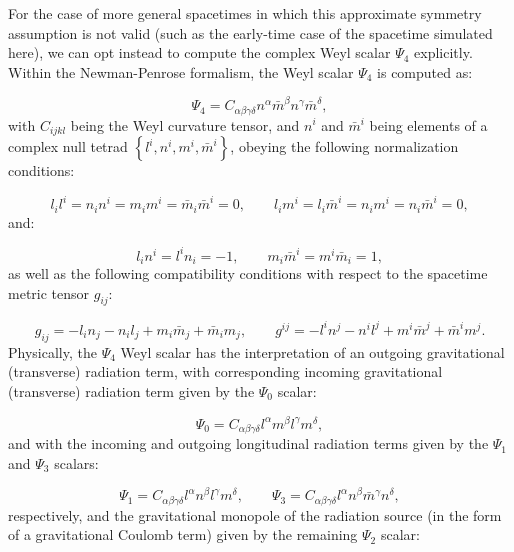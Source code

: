 \documentclass{article}
\begin{document}
For the case of more general spacetimes in which this approximate symmetry assumption is not valid (such as the early-time case of the spacetime simulated here), we can opt instead to compute the complex Weyl scalar ${\Psi_4}$ explicitly. Within the Newman-Penrose formalism\cite{newman}, the Weyl scalar ${\Psi_4}$ is computed as:

\begin{equation}
\Psi_4 = C_{\alpha \beta \gamma \delta} n^{\alpha} \bar{m}^{\beta} n^{\gamma} \bar{m}^{\delta},
\end{equation}
with ${C_{i j k l}}$ being the Weyl curvature tensor, and ${n^i}$ and ${\bar{m}^i}$ being elements of a complex null tetrad ${\left\lbrace l^i, n^i, m^i, \bar{m}^i \right\rbrace}$, obeying the following normalization conditions:

\begin{equation}
l_i l^i = n_i n^i = m_i m^i = \bar{m}_i \bar{m}^i = 0, \qquad l_i m^i = l_i \bar{m}^i = n_i m^i = n_i \bar{m}^i = 0,
\end{equation}
and:

\begin{equation}
l_i n^i = l^i n_i = -1, \qquad m_i \bar{m}^i = m^i \bar{m}_i = 1,
\end{equation}
as well as the following compatibility conditions with respect to the spacetime metric tensor ${g_{i j}}$:

\begin{equation}
g_{i j} = -l_i n_j - n_i l_j + m_i \bar{m}_j + \bar{m}_i m_j, \qquad g^{i j} = -l^i n^j - n^i l^j + m^i \bar{m}^j + \bar{m}^i m^j.
\end{equation}
Physically, the ${\Psi_4}$ Weyl scalar has the interpretation of an outgoing gravitational (transverse) radiation term\cite{szekeres2}, with corresponding incoming gravitational (transverse) radiation term given by the ${\Psi_0}$ scalar:

\begin{equation}
\Psi_0 = C_{\alpha \beta \gamma \delta} l^{\alpha} m^{\beta} l^{\gamma} m^{\delta},
\end{equation}
and with the incoming and outgoing longitudinal radiation terms given by the ${\Psi_1}$ and ${\Psi_3}$ scalars:

\begin{equation}
\Psi_1 = C_{\alpha \beta \gamma \delta} l^{\alpha} n^{\beta} l^{\gamma} m^{\delta}, \qquad \Psi_3 = C_{\alpha \beta \gamma \delta} l^{\alpha} n^{\beta} \bar{m}^{\gamma} n^{\delta},
\end{equation}
respectively, and the gravitational monopole of the radiation source (in the form of a gravitational Coulomb term) given by the remaining ${\Psi_2}$ scalar:
\end{document}
